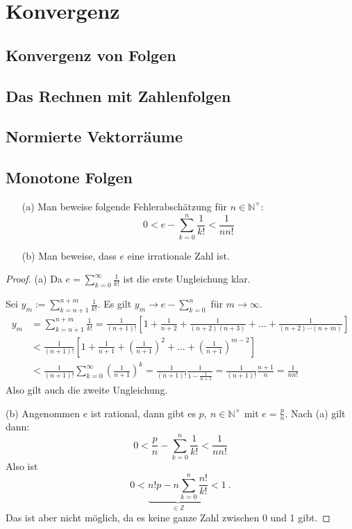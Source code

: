 \chapter{Konvergenz}
\section{Konvergenz von Folgen}
\section{Das Rechnen mit Zahlenfolgen}
\section{Normierte Vektorräume}
\section{Monotone Folgen}

\setcounter{aufgabe}{6}
\begin{aufgabe}
\begin{enumerate}
\item[(a)] Man beweise folgende Fehlerabschätzung für $n \in \mathbb N^\times$:
\[
0 < e - \sum_{k=0}^n \frac{1}{k!} < \frac{1}{n n!}
\]
\item[(b)] Man beweise, dass $e$ eine irrationale Zahl ist.
\end{enumerate}
\end{aufgabe}
\begin{proof}
\item[(a)] Da $e = \sum_{k=0}^\infty \frac{1}{k!}$ ist die erste Ungleichung klar.

Sei $y_m := \sum_{k = n+1}^{n + m} \frac{1}{k!}$. Es gilt 
$y_m \to e - \sum_{k=0}^n$ für $m \to \infty$.
\begin{align*}
y_m &= \sum_{k=n+1}^{n+m} \frac{1}{k!}
	= \frac{1}{(n+1)!} \left[ 1 + \frac{1}{n+2} + \frac{1}{(n+2)(n+3)} + \ldots
	+ \frac{1}{(n+2) \cdots (n+m)} \right] \\
	&< \frac{1}{(n+1)!} \left[ 1 + \frac{1}{n+1} + \left( \frac{1}{n+1} \right)^2 + \ldots
	+ \left( \frac{1}{n+1} \right)^{m-2} \right] \\
	&< \frac{1}{(n+1)!} \sum_{k=0}^\infty \left( \frac{1}{n+1} \right)^k
	= \frac{1}{(n+1)!} \frac{1}{1 - \frac{1}{n+1}} 
	= \frac{1}{(n+1)!} \frac{n+1}{n} = \frac{1}{n n!}
\end{align*}
Also gilt auch die zweite Ungleichung.

\item[(b)] Angenommen $e$ ist rational, dann gibt es $p, \ n \in \mathbb N^\times$
mit $e = \frac p n$. Nach (a) gilt dann:
\[
0 < \frac p n - \sum_{k=0}^n \frac{1}{k!} < \frac{1}{n n!}
\]
Also ist
\[
0 < \underbrace{ n! p - n \sum_{k=0}^n \frac{n!}{k!} }_{\in \mathbb Z} < 1 \ .
\]
Das ist aber nicht möglich, da es keine ganze Zahl zwischen 0 und 1 gibt.
\end{proof}

